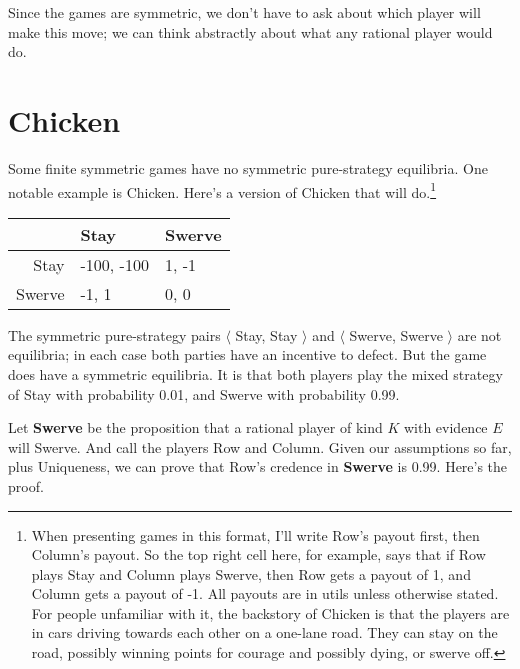 \documentclass[12pt,]{article}
\let\rmarkdownfootnote\footnote%
\def\footnote{\protect\rmarkdownfootnote}
\begin{document}
Since the games are symmetric, we don't have to ask about which player will make this move; we can think abstractly about what any rational player would do.

\hypertarget{chicken}{%
\section{Chicken}\label{chicken}}

Some finite symmetric games have no symmetric pure-strategy equilibria. One notable example is Chicken. Here's a version of Chicken that will do.\footnote{When presenting games in this format, I'll write Row's payout first, then Column's payout. So the top right cell here, for example, says that if Row plays Stay and Column plays Swerve, then Row gets a payout of 1, and Column gets a payout of -1. All payouts are in utils unless otherwise stated. For people unfamiliar with it, the backstory of Chicken is that the players are in cars driving towards each other on a one-lane road. They can stay on the road, possibly winning points for courage and possibly dying, or swerve off.}

\begin{longtable}[]{@{}rll@{}}
\toprule
& Stay & Swerve\tabularnewline
\midrule
\endhead
Stay & -100, -100 & 1, -1\tabularnewline
Swerve & -1, 1 & 0, 0\tabularnewline
\bottomrule
\end{longtable}

The symmetric pure-strategy pairs \(\langle\) Stay, Stay \(\rangle\) and \(\langle\) Swerve, Swerve \(\rangle\) are not equilibria; in each case both parties have an incentive to defect. But the game does have a symmetric equilibria. It is that both players play the mixed strategy of Stay with probability 0.01, and Swerve with probability 0.99.

Let \textbf{Swerve} be the proposition that a rational player of kind \(K\) with evidence \(E\) will Swerve. And call the players Row and Column. Given our assumptions so far, plus Uniqueness, we can prove that Row's credence in \textbf{Swerve} is 0.99. Here's the proof.
\end{document}

